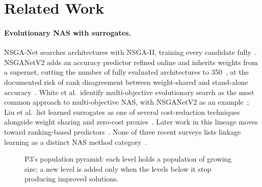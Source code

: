 
\section{Related Work}
\label{sec:related-work}

\paragraph{Evolutionary NAS with surrogates.} NSGA-Net searches architectures with NSGA-II, training every
candidate fully~\citep{lu2019nsganet}. NSGANetV2 adds an accuracy predictor refined online and inherits weights
from a supernet, cutting the number of fully evaluated architectures to 350~\citep{lu2020nsganetv2}, at the
documented risk of rank disagreement between weight-shared and stand-alone accuracy~\citep{yu2020evaluatingnas}.
White et al.\ identify multi-objective evolutionary search as the most common approach to multi-objective NAS,
with NSGANetV2 as an example~\citep{white2023insights}; Liu et al.\ list learned surrogates as one of several
cost-reduction techniques alongside weight sharing and zero-cost proxies~\citep{liu2023survey}. Later work in
this lineage moves toward ranking-based predictors~\citep{lu2022mosegnas}. None of three recent surveys lists
linkage learning as a distinct NAS method category~\citep{liu2023survey,white2023insights,ozcelik2026survey}.



\begin{figure}[t]
    \centering
    \caption{P3's population pyramid: each level holds a population of growing size; a new level is added only
    when the levels below it stop producing improved solutions.}
    \label{fig:p3-pyramid}
\end{figure}

